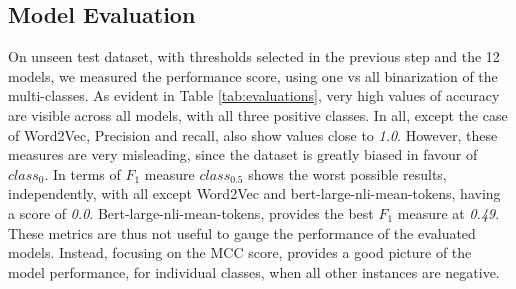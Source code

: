 \documentclass{ieeeaccess}
\begin{document}
\subsection{Model Evaluation}
On unseen test dataset, with thresholds selected in the previous step and the 12 models, we measured the performance score, using one vs all binarization of the multi-classes. As evident in Table \ref{tab:evaluations}, very high values of accuracy are visible across all models, with all three positive classes. In all, except the case of Word2Vec, Precision and recall, also show values close to \textit{1.0}. However, these measures are very misleading, since the dataset is greatly biased in favour of $class_0$. In terms of $F_1$ measure $class_{0.5}$ shows the worst possible results, independently, with all except Word2Vec and bert-large-nli-mean-tokens, having a score of \textit{0.0}. Bert-large-nli-mean-tokens, provides the best $F_1$ measure at \textit{0.49}. These metrics are thus not useful to gauge the performance of the evaluated models. Instead, focusing on the MCC score, provides a good picture of the model performance, for individual classes, when all other instances are negative.
\end{document}
